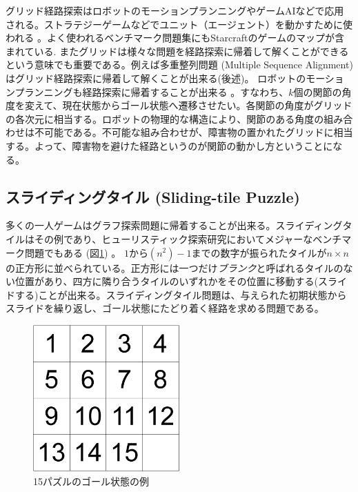 グリッド経路探索はロボットのモーションプランニングやゲームAIなどで応用される\cite{algfoor2015comprehensive}。ストラテジーゲームなどでユニット（エージェント）を動かすために使われる \cite{cui2011based}。よく使われるベンチマーク問題集にもStarcraftのゲームのマップが含まれている\cite{sturtevant2012benchmarks}.
またグリッドは様々な問題を経路探索に帰着して解くことができるという意味でも重要である。例えば多重整列問題 (Multiple Sequence Alignment)はグリッド経路探索に帰着して解くことが出来る(後述)。
ロボットのモーションプランニングも経路探索に帰着することが出来る \cite{barraquand91}。すなわち、$k$個の関節の角度を変えて、現在状態からゴール状態へ遷移させたい。各関節の角度がグリッドの各次元に相当する。ロボットの物理的な構造により、関節のある角度の組み合わせは不可能である。不可能な組み合わせが、障害物の置かれたグリッドに相当する。よって、障害物を避けた経路というのが関節の動かし方ということになる。



\subsection{スライディングタイル (Sliding-tile Puzzle)}

多くの一人ゲームはグラフ探索問題に帰着することが出来る。スライディングタイルはその例であり、ヒューリスティック探索研究においてメジャーなベンチマーク問題でもある (図\ref{fig:15-puzzle}) \cite{johnson1879notes}。
$1$から$(n^2)-1$までの数字が振られたタイルが$n\times n$の正方形に並べられている。正方形には一つだけ{\it ブランク}と呼ばれるタイルのない位置があり、四方に隣り合うタイルのいずれかをその位置に移動する(スライドする)ことが出来る。スライディングタイル問題は、与えられた初期状態からスライドを繰り返し、ゴール状態にたどり着く経路を求める問題である。

\begin{figure}
\centering
\includegraphics[bb=0 0 372 373,width=0.5\textwidth]{figures/15-puzzle.png}
\caption{15パズルのゴール状態の例}
\label{fig:15-puzzle}
\end{figure}



